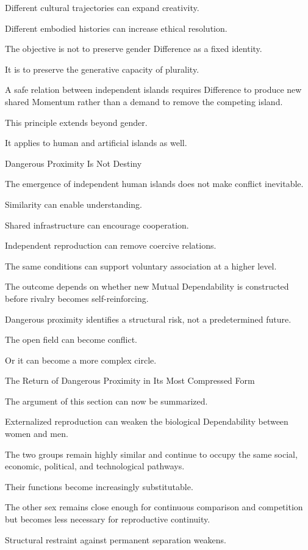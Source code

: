 Different cultural trajectories can expand creativity.

Different embodied histories can increase ethical resolution.

The objective is not to preserve gender Difference as a fixed identity.

It is to preserve the generative capacity of plurality.

A safe relation between independent islands requires Difference to produce new shared Momentum rather than a demand to remove the competing island.

This principle extends beyond gender.

It applies to human and artificial islands as well.

Dangerous Proximity Is Not Destiny

The emergence of independent human islands does not make conflict inevitable.

Similarity can enable understanding.

Shared infrastructure can encourage cooperation.

Independent reproduction can remove coercive relations.

The same conditions can support voluntary association at a higher level.

The outcome depends on whether new Mutual Dependability is constructed before rivalry becomes self-reinforcing.

Dangerous proximity identifies a structural risk, not a predetermined future.

The open field can become conflict.

Or it can become a more complex circle.

The Return of Dangerous Proximity in Its Most Compressed Form

The argument of this section can now be summarized.

Externalized reproduction can weaken the biological Dependability between women and men.

The two groups remain highly similar and continue to occupy the same social, economic, political, and technological pathways.

Their functions become increasingly substitutable.

The other sex remains close enough for continuous comparison and competition but becomes less necessary for reproductive continuity.

Structural restraint against permanent separation weakens.


